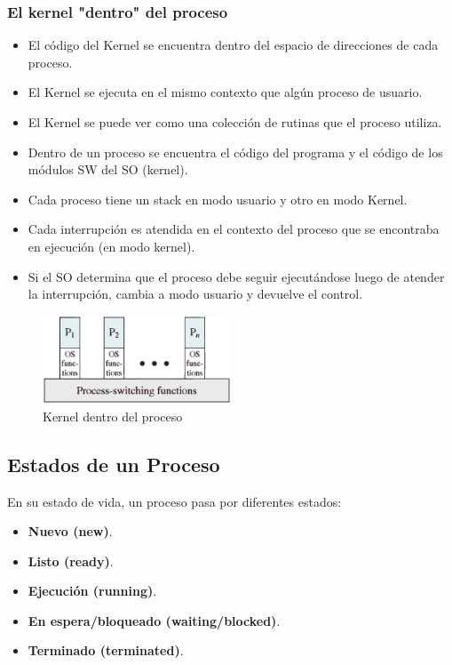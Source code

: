 \subsubsection{El kernel "dentro" del proceso}
\begin{itemize}
    \item El código del Kernel se encuentra dentro del espacio de direcciones de cada proceso.
    \item El Kernel se ejecuta en el mismo contexto que algún proceso de usuario.
    \item El Kernel se puede ver como una colección de rutinas que el proceso utiliza.
    \item Dentro de un proceso se encuentra el código del programa y el código de los módulos SW del SO (kernel).
    \item Cada proceso tiene un stack en modo usuario y otro en modo Kernel. 
    \item Cada interrupción es atendida en el contexto del proceso que se encontraba en ejecución (en modo kernel).
    \item Si el SO determina que el proceso debe seguir ejecutándose luego de atender la interrupción, cambia a modo usuario y devuelve el control.
\end{itemize}
\vspace{2cm}
\begin{figure}[ht]
    \begin{center}
        \includegraphics[width=0.50\textwidth]{assets/Kernel2.eps}
    \end{center}
    \caption{Kernel dentro del proceso}\label{fig:}
\end{figure}

\subsection{Estados de un Proceso}
En su estado de vida, un proceso pasa por diferentes estados:
\begin{itemize}
    \item \textbf{Nuevo (new)}.
    \item \textbf{Listo (ready)}.
    \item \textbf{Ejecución (running)}.
    \item \textbf{En espera/bloqueado (waiting/blocked)}.
    \item \textbf{Terminado (terminated)}.
\end{itemize}

